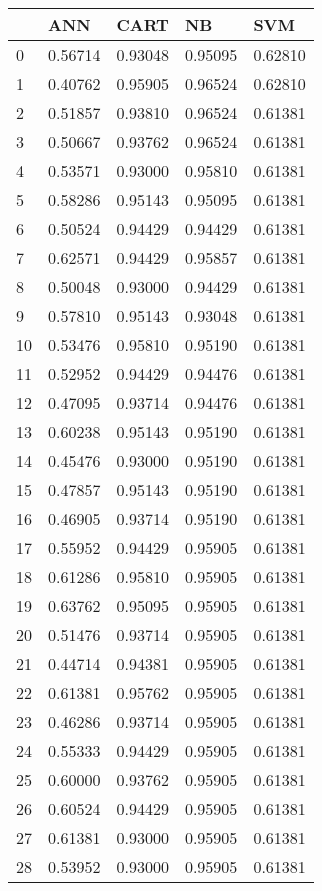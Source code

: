 \begin{tabular}{|l|l|l|l|l|}
\toprule
{} &      ANN &     CART &       NB &      SVM \\
\midrule
0  &  0.56714 &  0.93048 &  0.95095 &  0.62810 \\
1  &  0.40762 &  0.95905 &  0.96524 &  0.62810 \\
2  &  0.51857 &  0.93810 &  0.96524 &  0.61381 \\
3  &  0.50667 &  0.93762 &  0.96524 &  0.61381 \\
4  &  0.53571 &  0.93000 &  0.95810 &  0.61381 \\
5  &  0.58286 &  0.95143 &  0.95095 &  0.61381 \\
6  &  0.50524 &  0.94429 &  0.94429 &  0.61381 \\
7  &  0.62571 &  0.94429 &  0.95857 &  0.61381 \\
8  &  0.50048 &  0.93000 &  0.94429 &  0.61381 \\
9  &  0.57810 &  0.95143 &  0.93048 &  0.61381 \\
10 &  0.53476 &  0.95810 &  0.95190 &  0.61381 \\
11 &  0.52952 &  0.94429 &  0.94476 &  0.61381 \\
12 &  0.47095 &  0.93714 &  0.94476 &  0.61381 \\
13 &  0.60238 &  0.95143 &  0.95190 &  0.61381 \\
14 &  0.45476 &  0.93000 &  0.95190 &  0.61381 \\
15 &  0.47857 &  0.95143 &  0.95190 &  0.61381 \\
16 &  0.46905 &  0.93714 &  0.95190 &  0.61381 \\
17 &  0.55952 &  0.94429 &  0.95905 &  0.61381 \\
18 &  0.61286 &  0.95810 &  0.95905 &  0.61381 \\
19 &  0.63762 &  0.95095 &  0.95905 &  0.61381 \\
20 &  0.51476 &  0.93714 &  0.95905 &  0.61381 \\
21 &  0.44714 &  0.94381 &  0.95905 &  0.61381 \\
22 &  0.61381 &  0.95762 &  0.95905 &  0.61381 \\
23 &  0.46286 &  0.93714 &  0.95905 &  0.61381 \\
24 &  0.55333 &  0.94429 &  0.95905 &  0.61381 \\
25 &  0.60000 &  0.93762 &  0.95905 &  0.61381 \\
26 &  0.60524 &  0.94429 &  0.95905 &  0.61381 \\
27 &  0.61381 &  0.93000 &  0.95905 &  0.61381 \\
28 &  0.53952 &  0.93000 &  0.95905 &  0.61381 \\
\bottomrule
\end{tabular}
